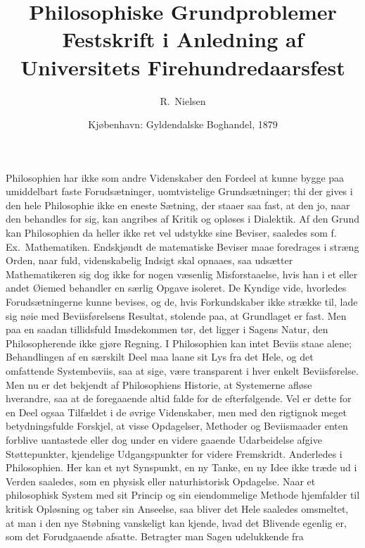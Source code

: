 \documentclass[12pt]{article}
\title{\textbf{Philosophiske Grundproblemer}\\[0.5em]
  \large Festskrift i Anledning af Universitets Firehundredaarsfest}
\author{R.\ Nielsen}
\date{Kjøbenhavn: Gyldendalske Boghandel, 1879}
\begin{document}
\maketitle
\tableofcontents
\bigskip




\noindent
Philosophien har ikke som andre Videnskaber den Fordeel at
kunne bygge paa umiddelbart faste Forudsætninger, uomtvistelige
Grundsætninger; thi der gives i den hele Philosophie ikke en
eneste Sætning, der staaer saa fast, at den jo, naar den behandles
for sig, kan angribes af Kritik og opløses i Dialektik. Af den
Grund kan Philosophien da heller ikke ret vel udstykke sine
Beviser, saaledes som f.\,Ex.\ Mathematiken. Endskjøndt de
matematiske Beviser maae foredrages i stræng Orden, naar
fuld, videnskabelig Indsigt skal opnaaes, saa udsætter
Mathematikeren sig dog ikke for nogen væsenlig Misforstaaelse,
hvis han i et eller andet Øiemed behandler en særlig Opgave
isoleret. De Kyndige vide, hvorledes Forudsætningerne kunne
bevises, og de, hvis Forkundskaber ikke strække til, lade sig
nøie med Beviisførelsens Resultat, stolende paa, at Grundlaget
er fast. Men paa en saadan tillidsfuld Imødekommen tør, det
ligger i Sagens Natur, den Philosopherende ikke gjøre Regning.
I Philosophien kan intet Beviis staae alene; Behandlingen af en
særskilt Deel maa laane sit Lys fra det Hele, og det omfattende
Systembeviis, saa at sige, være transparent i hver enkelt
Beviisførelse. Men nu er det bekjendt af Philosophiens Historie,
at Systemerne afløse hverandre, saa at de foregaaende altid
falde for de efterfølgende. Vel er dette for en Deel ogsaa
Tilfældet i de øvrige Videnskaber, men med den rigtignok
meget betydningsfulde Forskjel, at visse Opdagelser, Methoder
og Beviismaader enten forblive uantastede eller dog under en
videre gaaende Udarbeidelse afgive Støttepunkter, kjendelige
Udgangspunkter for videre Fremskridt. Anderledes i Philosophien.
Her kan et nyt Synspunkt, en ny
Tanke, en ny Idee ikke træde ud i Verden saaledes, som en
physisk eller naturhistorisk Opdagelse. Naar et philosophisk
System med sit Princip og sin eiendommelige Methode
hjemfalder til kritisk Opløsning og taber sin Anseelse, saa
bliver det Hele saaledes omsmeltet, at man i den nye Støbning
vanskeligt kan kjende, hvad det Blivende egenlig er, som det
Forudgaaende afsatte. Betragter man Sagen udelukkende fra
\end{document}
